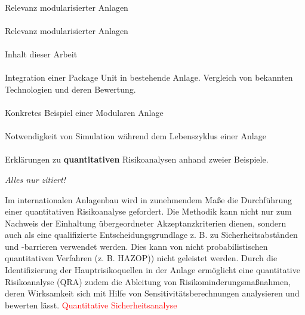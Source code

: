 \paragraph*{\cite{Lier2016}} Relevanz modularisierter Anlagen

\paragraph*{\cite{Obst2013a}} Relevanz modularisierter Anlagen

\paragraph*{\cite{Obst2014}}
Inhalt dieser Arbeit

\paragraph*{\cite{Obst2013}}
Integration einer Package Unit in bestehende Anlage. Vergleich von bekannten Technologien und deren Bewertung.

\paragraph*{\cite{Ohle2014}} Konkretes Beispiel einer Modularen Anlage

\paragraph*{\cite{Oppelt2015}}
Notwendigkeit von Simulation w\"ahrend dem Lebenszyklus einer Anlage

\paragraph*{\cite{Rath2009}} Erkl\"arungen zu \textbf{quantitativen} Risikoanalysen anhand zweier Beispiele. \hfill \newline

\textit{Alles nur zitiert!} \hfill \newline

Im internationalen Anlagenbau wird in zunehmendem Ma\ss{}e die Durchf\"uhrung einer quantitativen Risikoanalyse gefordert. Die Methodik kann nicht nur zum Nachweis der Einhaltung \"ubergeordneter Akzeptanzkriterien dienen, sondern auch als eine qualifizierte Entscheidungsgrundlage z. B. zu Sicherheitsabst\"anden und -barrieren verwendet werden. Dies kann von nicht probabilistischen quantitativen Verfahren (z. B. HAZOP)) nicht geleistet werden. Durch die Identifizierung der Hauptrisikoquellen in der Anlage erm\"oglicht eine quantitative Risikoanalyse (QRA) zudem die Ableitung von Risikominderungsma\ss{}nahmen, deren
Wirksamkeit sich mit Hilfe von Sensitivit\"atsberechnungen analysieren und bewerten l\"asst. \textcolor{red}{Quantitative Sicherheitsanalyse}

